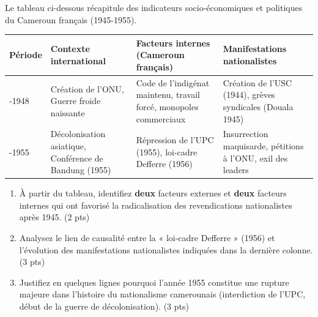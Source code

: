 \documentclass[11pt]{article}
\begin{document}
\begin{exercice}
Le tableau ci-dessous récapitule des indicateurs socio-économiques et politiques du Cameroun français (1945-1955).

\begin{tabularx}{\linewidth}{>{\hsize=1.2\hsize}X >{\hsize=1.8\hsize}X >{\hsize=1.5\hsize}X >{\hsize=1.5\hsize}X}
\hline
\textbf{Période} & \textbf{Contexte international} & \textbf{Facteurs internes (Cameroun français)} & \textbf{Manifestations nationalistes} \\
\hline
1945-1948 & Création de l'ONU, Guerre froide naissante & Code de l'indigénat maintenu, travail forcé, monopoles commerciaux & Création de l'USC (1944), grèves syndicales (Douala 1945) \\
\hline
1948-1955 & Décolonisation asiatique, Conférence de Bandung (1955) & Répression de l'UPC (1955), loi-cadre Defferre (1956) & Insurrection maquisarde, pétitions à l'ONU, exil des leaders \\
\hline
\end{tabularx}

\begin{enumerate}
    \item À partir du tableau, identifiez \textbf{deux} facteurs externes et \textbf{deux} facteurs internes qui ont favorisé la radicalisation des revendications nationalistes après 1945. (2 pts)
    \item Analysez le lien de causalité entre la « loi-cadre Defferre » (1956) et l'évolution des manifestations nationalistes indiquées dans la dernière colonne. (3 pts)
    \item Justifiez en quelques lignes pourquoi l'année 1955 constitue une rupture majeure dans l'histoire du nationalisme camerounais (interdiction de l'UPC, début de la guerre de décolonisation). (3 pts)
\end{enumerate}
\end{exercice}
\end{document}
